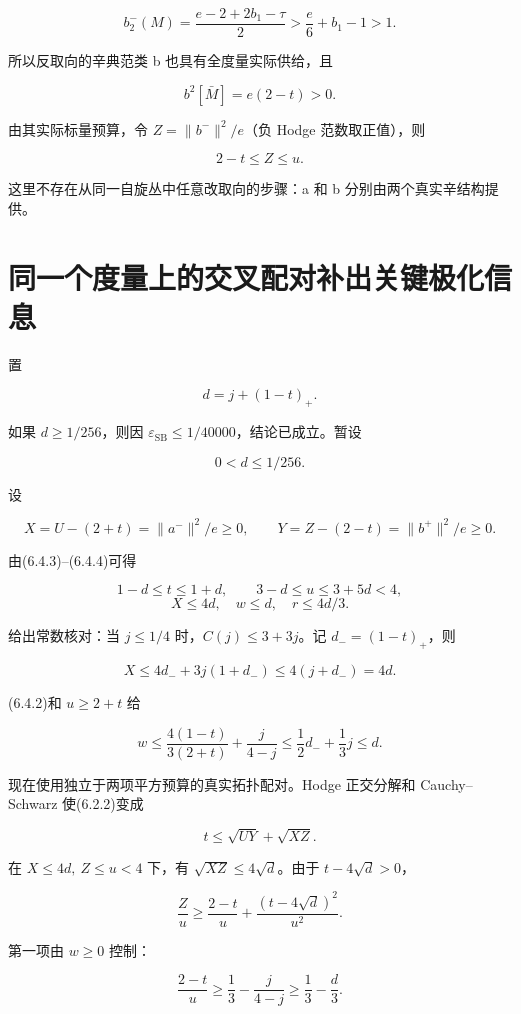 \documentclass[UTF8,11pt,openany,fontset=none]{ctexbook}
\theoremstyle{definition}
\theoremstyle{remark}
\begin{document}
\[
b_2^-(M)=\frac{e-2+2b_1-\tau}{2}
>\frac e6+b_1-1>1.
\]

所以反取向的辛典范类 b 也具有全度量实际供给，且

\[
b^2[\bar M]=e(2-t)>0.
\]

由其实际标量预算，令 \(Z=\|b^-\|^2/e\)（负 Hodge 范数取正值），则

\[
2-t\le Z\le u.
\tag{6.4.5}
\]

这里不存在从同一自旋丛中任意改取向的步骤：a 和 b 分别由两个真实辛结构提供。

\section{同一个度量上的交叉配对补出关键极化信息}\label{v6-ux540cux4e00ux4e2aux5ea6ux91cfux4e0aux7684ux4ea4ux53c9ux914dux5bf9ux8865ux51faux5173ux952eux6781ux5316ux4fe1ux606f}

置

\[
d=j+(1-t)_+.
\]

如果 \(d\ge1/256\)，则因 \(\varepsilon_{\mathrm{SB}}\le1/40000\)，结论已成立。暂设

\[
0<d\le1/256.
\tag{6.5.1}
\]

设

\[
X=U-(2+t)=\|a^-\|^2/e\ge0,
\qquad Y=Z-(2-t)=\|b^+\|^2/e\ge0.
\]

由(6.4.3)--(6.4.4)可得

\[
1-d\le t\le1+d,\qquad 3-d\le u\le3+5d<4,
\] \[
\boxed{X\le4d,\quad w\le d,\quad r\le4d/3.}
\tag{6.5.2}
\]

给出常数核对：当 \(j\le 1/4\) 时，\(C(j)\le3+3j\)。记 \(d_-=(1-t)_+\)，则

\[
X\le4d_-+3j(1+d_-)\le4(j+d_-)=4d.
\]

(6.4.2)和 \(u\ge2+t\) 给

\[
w\le\frac{4(1-t)}{3(2+t)}+\frac{j}{4-j}
\le\frac12d_-+\frac13j\le d.
\]

现在使用独立于两项平方预算的真实拓扑配对。Hodge 正交分解和 Cauchy--Schwarz 使(6.2.2)变成

\[
\boxed{t\le\sqrt{UY}+\sqrt{XZ}.}
\tag{6.5.3}
\]

在 \(X\le4d,\ Z\le u<4\) 下，有 \(\sqrt{XZ}\le4\sqrt d\)。由于 \(t-4\sqrt d>0\)，

\[
\frac Zu\ge\frac{2-t}{u}
+\frac{(t-4\sqrt d)^2}{u^2}.
\tag{6.5.4}
\]

第一项由 \(w\ge0\) 控制：

\[
\frac{2-t}{u}\ge\frac13-\frac j{4-j}\ge\frac13-\frac d3.
\]
\end{document}
